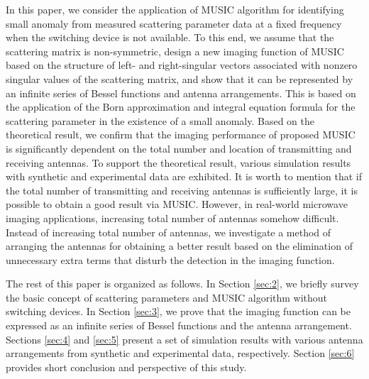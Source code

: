 \documentclass[3p,10pt]{elsarticle}
\theoremstyle{plain}
\theoremstyle{remark}
\begin{document}
In this paper, we consider the application of MUSIC algorithm for identifying small anomaly from measured scattering parameter data at a fixed frequency when the switching device is not available. To this end, we assume that the scattering matrix is non-symmetric, design a new imaging function of MUSIC based on the structure of left- and right-singular vectors associated with nonzero singular values of the scattering matrix, and show that it can be represented by an infinite series of Bessel functions and antenna arrangements. This is based on the application of the Born approximation and integral equation formula for the scattering parameter in the existence of a small anomaly. Based on the theoretical result, we confirm that the imaging performance of proposed MUSIC is significantly dependent on the total number and location of transmitting and receiving antennas. To support the theoretical result, various simulation results with synthetic and experimental data are exhibited. It is worth to mention that if the total number of transmitting and receiving antennas is sufficiently large, it is possible to obtain a good result via MUSIC. However, in real-world microwave imaging applications, increasing total number of antennas somehow difficult. Instead of increasing total number of antennas, we investigate a method of arranging the antennas for obtaining a better result based on the elimination of unnecessary extra terms  that disturb the detection in the imaging function.

The rest of this paper is organized as follows. In Section \ref{sec:2}, we briefly survey the basic concept of scattering parameters and MUSIC algorithm without switching devices. In Section \ref{sec:3}, we prove that the imaging function can be expressed as an infinite series of Bessel functions and the antenna arrangement. Sections \ref{sec:4} and \ref{sec:5} present a set of simulation results with various antenna arrangements from synthetic and experimental data, respectively. Section \ref{sec:6} provides short conclusion and perspective of this study.
\end{document}

